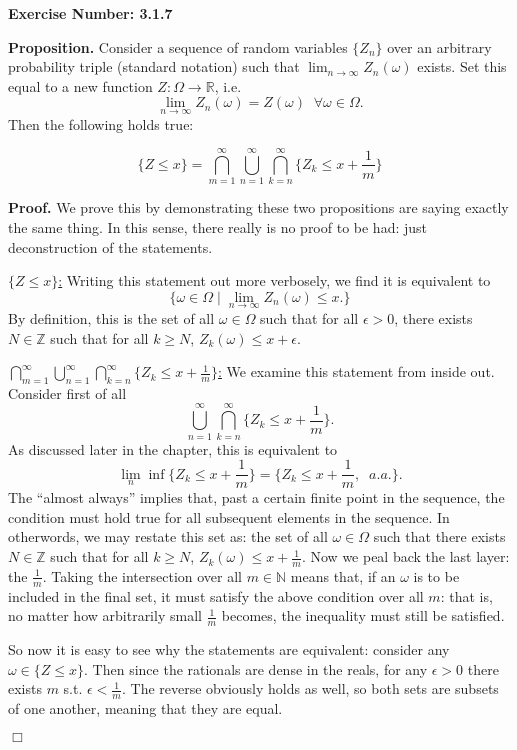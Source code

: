 \documentclass{article}
\begin{document}
\noindent \textbf{Exercise Number: 3.1.7}  %

\medskip 

\noindent \textbf{Proposition.} Consider a sequence of random variables $\{Z_n\}$ over an arbitrary probability triple (standard notation) such that $\lim_{n \to \infty} Z_n(\omega)$ exists. Set this equal to a new function $Z: \Omega \to \mathbb{R}$, i.e. \[\lim_{n \to \infty} Z_n(\omega) = Z(\omega) \;\; \forall \omega \in \Omega .\] Then the following holds true: 

\[\{Z \leq x\} = \bigcap_{m = 1}^\infty \bigcup_{n = 1}^\infty \bigcap_{k = n}^\infty \Bigg \{ Z_k \leq x + \frac{1}{m} \Bigg\} \]

\bigskip

\noindent \textbf{Proof.} We prove this by demonstrating these two propositions are saying
exactly the same thing. In this sense, there really is no proof to be had: just deconstruction
of the statements. 

\bigskip

\noindent \underline{$\{Z \leq x\}$:} Writing this statement out more verbosely, we find it is equivalent to \[ \{\omega \in \Omega \mid \lim_{n \to \infty} Z_n(\omega) \leq x.\} \] By definition, this is the set of all $\omega \in \Omega$ such that for all $\epsilon > 0$, there exists $N \in \mathbb{Z}$ such that for all $k \geq N$, $Z_k(\omega) \leq x + \epsilon$. 

\bigskip

\noindent \underline{$\bigcap_{m = 1}^\infty \bigcup_{n = 1}^\infty \bigcap_{k = n}^\infty \Bigg \{ Z_k \leq x + \frac{1}{m} \Bigg\}$:} We examine this statement from inside out. Consider first of all \[\bigcup_{n = 1}^\infty \bigcap_{k = n}^\infty \Bigg \{ Z_k \leq x + \frac{1}{m} \Bigg\}.\] As discussed later in the chapter, this is equivalent to \[\lim_n \inf \Bigg \{  Z_k \leq x + \frac{1}{m} \Bigg \}  = \Bigg \{ Z_k \leq x + \frac{1}{m}, \;\; a.a. \Bigg \}.\] The ``almost always'' implies that, past a certain finite point in the sequence, the condition must hold true for all subsequent elements in the sequence. In otherwords, we may restate this set as: the set of all $\omega \in \Omega$ such that there exists $N \in \mathbb{Z}$ such that for all $k \geq N$, $Z_k(\omega) \leq x + \frac{1}{m}$. Now we peal back the last layer: the $\frac{1}{m}$. Taking the intersection over all $m \in \mathbb{N}$ means that, if an $\omega$ is to be included in the final set, it must satisfy the above condition over all $m$: that is, no matter how arbitrarily small $\frac{1}{m}$ becomes, the inequality must still be satisfied. 

So now it is easy to see why the statements are equivalent: consider any $\omega \in \{Z \leq x\}$. Then since the rationals are dense in the reals, for any $\epsilon > 0$ there exists $m$ s.t. $\epsilon < \frac{1}{m}$. The reverse obviously holds as well, so both sets are subsets of one another, meaning that they are equal.

\hfill $\Box$
\end{document}
